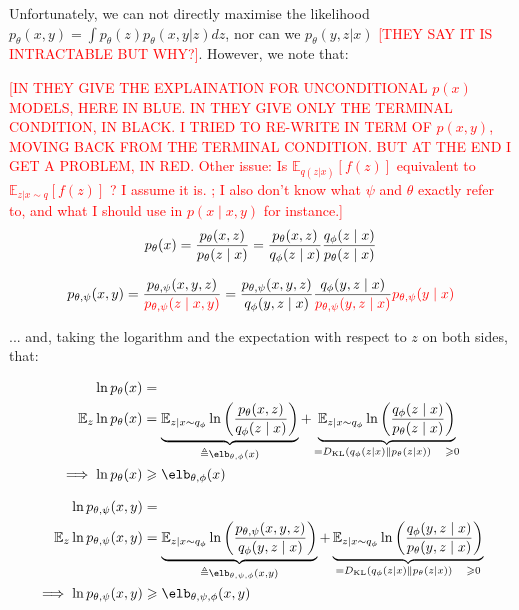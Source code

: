 \documentclass{article}
\begin{document}
\begin{appendix}
Unfortunately, we can not directly maximise the likelihood $p_{\theta}(x,y)=\int p_\theta(z)p_\theta(x,y|z) dz$, nor can we $p_\theta(y,z|x)$ \textcolor{red}{[THEY SAY IT IS INTRACTABLE BUT WHY?]}.
However, we note that:

\textcolor{red}{[IN \cite{probml-advanced} THEY GIVE THE EXPLAINATION FOR UNCONDITIONAL $p(x)$ MODELS, HERE IN BLUE. IN \cite{zeroshot} THEY GIVE ONLY THE TERMINAL CONDITION, IN BLACK. I TRIED TO RE-WRITE IN TERM OF $p(x,y)$, MOVING BACK FROM THE TERMINAL CONDITION. BUT AT THE END I GET A PROBLEM, IN RED. Other issue: Is $\mathbb{E}_{q(z|x)}[f(z)]$ equivalent to $\mathbb{E}_{z|x\sim q}[f(z)]$ ? I assume it is. ; I also don't know what $\psi$ and $\theta$ exactly refer to, and what I should use in $p(x \mid x,y)$ for instance.]}
\textcolor{blue}{
$$
p_\theta(x) = \frac{ p_\theta(x,z) }{ p_\theta(z \mid x) } = \frac{ p_\theta(x,z) }{ q_\phi(z \mid x) }\frac{ q_\phi(z \mid x) }{ p_\theta(z \mid x) }
$$
}

$$
p_{\theta,\psi}(x, y) = \frac{ p_{\theta,\psi}(x,y,z) }{  \textcolor{red}{p_{\theta,\psi}(z \mid x, y)} } = \frac{ p_{\theta,\psi}(x,y,z) }{ q_\phi(y, z \mid x) }\frac{ q_\phi(y, z \mid x) }{  \textcolor{red}{p_{\theta,\psi}(y, z \mid x)} } \textcolor{red}{p_{\theta,\psi}(y \mid x)}
$$



... and, taking the logarithm and the expectation with respect to $z$ on both sides, that:

\begin{comment}
\end{comment}

\textcolor{blue}{
$$
\begin{aligned}
\ln \pt(x) & = \\
\esp_z \ln \pt(x) & =
\underbrace{
    \esp_{z|x\sim q_\phi} \ln \left( \frac{ \pt(x,z) }{ \qp(z \mid x) } \right)
}_{
    \triangleq \elb_{\theta, \phi}(x)
}
+ \underbrace{
    \esp_{z|x \sim q_\phi} \ln \left( \frac{ \qp(z \mid x) }{ \pt(z \mid x) } \right)
}_{
    = \KL ( q_{\phi}(z \mid x) \| \pt (z \mid x) ) \quad \geqslant 0
} \\
\implies \ln \pt(x) & \geqslant \elb_{\theta, \phi}(x)
\end{aligned}
$$
}

$$
\begin{aligned}
\ln \ptp(x,y) & = \\
\esp_z \ln \ptp(x,y) & =
\underbrace{
    \esp_{z|x\sim q_\phi} \ln \left( \frac{ \ptp(x,y,z) }{ \qp(y, z \mid x) } \right)
}_{
    \triangleq \elb_{\theta, \psi, \phi}(x,y)
}
+ \underbrace{
    \esp_{z|x \sim q_\phi} \ln \left( \frac{ \qp(y, z \mid x) }{ \pt(y, z \mid x) } \right)
}_{
    = \KL ( q_{\phi}(z \mid x) \| \pt (z \mid x) ) \quad \geqslant 0
} \\
\implies \ln \ptp(x,y) & \geqslant \elb_{\theta, \psi, \phi}(x,y)
\end{aligned}
$$


\end{appendix}
\end{document}
